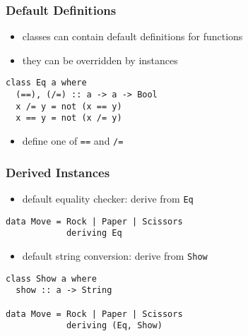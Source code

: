 \documentclass[dvipsnames]{beamer}
\theoremstyle{plain}
\begin{document}
\begin{frame}[fragile]
  \frametitle{Default Definitions}

  \begin{itemize}
    \item classes can contain default definitions for functions
    \item they can be overridden by instances
  \end{itemize}

  \begin{exampleblock}{}
    \begin{lstlisting}
class Eq a where
  (==), (/=) :: a -> a -> Bool
  x /= y = not (x == y)
  x == y = not (x /= y)
    \end{lstlisting}
  \end{exampleblock}

  \begin{itemize}
    \item define one of \lstinline|==| and \lstinline|/=|
  \end{itemize}
\end{frame}

\begin{frame}[fragile]
  \frametitle{Derived Instances}

  \begin{itemize}
    \item default equality checker: derive from \lstinline|Eq|
  \end{itemize}

  \begin{exampleblock}{}
    \begin{lstlisting}
data Move = Rock | Paper | Scissors
            deriving Eq
    \end{lstlisting}
  \end{exampleblock}

  \pause
  \begin{itemize}
    \item default string conversion: derive from \lstinline|Show|
  \end{itemize}

  \begin{exampleblock}{}
    \begin{lstlisting}
class Show a where
  show :: a -> String

data Move = Rock | Paper | Scissors
            deriving (Eq, Show)
   \end{lstlisting}
  \end{exampleblock}
\end{frame}
\end{document}
